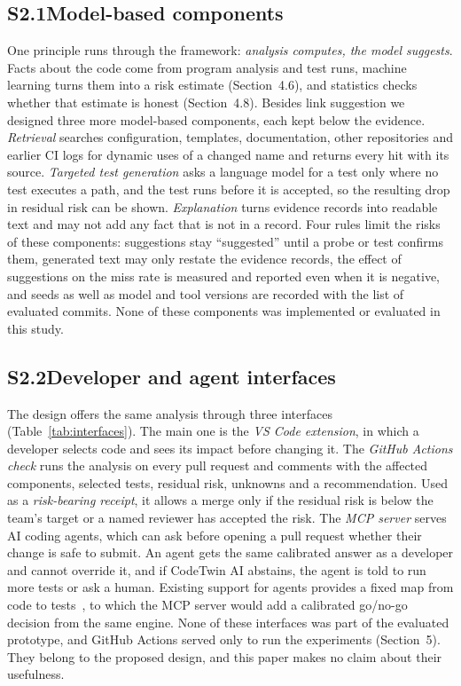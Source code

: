 \documentclass[11pt]{article}
\begin{document}
\subsection*{S2.1\quad Model-based components}
One principle runs through the framework: \emph{analysis computes, the model suggests}. Facts about the code come from program analysis and test runs, machine learning turns them into a risk estimate (Section~4.6), and statistics checks whether that estimate is honest (Section~4.8). Besides link suggestion we designed three more model-based components, each kept below the evidence. \emph{Retrieval} searches configuration, templates, documentation, other repositories and earlier CI logs for dynamic uses of a changed name and returns every hit with its source. \emph{Targeted test generation} asks a language model for a test only where no test executes a path, and the test runs before it is accepted, so the resulting drop in residual risk can be shown. \emph{Explanation} turns evidence records into readable text and may not add any fact that is not in a record. Four rules limit the risks of these components: suggestions stay ``suggested'' until a probe or test confirms them, generated text may only restate the evidence records, the effect of suggestions on the miss rate is measured and reported even when it is negative, and seeds as well as model and tool versions are recorded with the list of evaluated commits. None of these components was implemented or evaluated in this study.

\subsection*{S2.2\quad Developer and agent interfaces}
The design offers the same analysis through three interfaces (Table~\ref{tab:interfaces}). The main one is the \emph{VS Code extension}, in which a developer selects code and sees its impact before changing it. The \emph{GitHub Actions check} runs the analysis on every pull request and comments with the affected components, selected tests, residual risk, unknowns and a recommendation. Used as a \emph{risk-bearing receipt}, it allows a merge only if the residual risk is below the team's target or a named reviewer has accepted the risk. The \emph{MCP server} serves AI coding agents, which can ask before opening a pull request whether their change is safe to submit. An agent gets the same calibrated answer as a developer and cannot override it, and if CodeTwin AI abstains, the agent is told to run more tests or ask a human. Existing support for agents provides a fixed map from code to tests~\cite{alonso2026tdad}, to which the MCP server would add a calibrated go/no-go decision from the same engine. None of these interfaces was part of the evaluated prototype, and GitHub Actions served only to run the experiments (Section~5). They belong to the proposed design, and this paper makes no claim about their usefulness.
\end{document}

